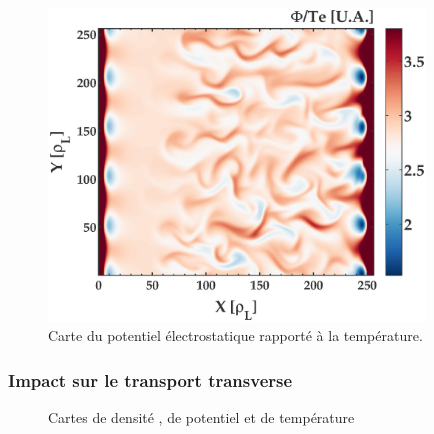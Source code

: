 \begin{refsection}
	\begin{figure}[htbp]
\centering
    \includegraphics[width=10cm]{figures/2-CartePotentielSurTeWhTedNdx.eps}
    \caption{Carte du potentiel électrostatique rapporté à la température.}
    \label{2-CartePotentielSurTeWhTedNdx}
\end{figure}

	
	\subsubsection{Impact sur le transport transverse}
	
	\begin{figure}[htbp]
    \centering
    \caption{Cartes de densité , de potentiel
     et de température }
    \label{2-CartesWithTe}
	\end{figure}
	

\end{refsection}
